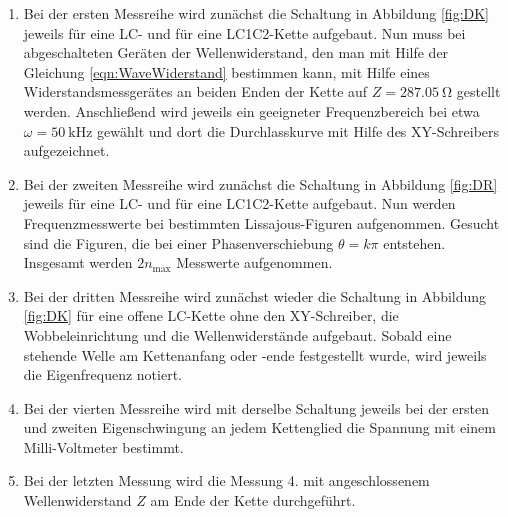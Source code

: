 \begin{enumerate}

\item
Bei der ersten Messreihe wird zunächst die Schaltung in Abbildung
\ref{fig:DK} jeweils für eine LC- und für eine LC1C2-Kette aufgebaut. Nun muss
bei abgeschalteten Geräten der Wellenwiderstand, den man mit Hilfe der
Gleichung \eqref{eqn:WaveWiderstand} bestimmen kann, mit Hilfe eines
Widerstandsmessgerätes
an beiden Enden der Kette auf $Z = \SI{287.05}{\ohm}$ gestellt werden.
Anschließend wird jeweils ein geeigneter Frequenzbereich bei etwa $\omega =
\SI{50}{\kilo\Hz}$ gewählt und dort die Durchlasskurve mit Hilfe des
XY-Schreibers aufgezeichnet.

\item
Bei der zweiten Messreihe wird zunächst die Schaltung in Abbildung
\ref{fig:DR} jeweils für eine LC- und für eine LC1C2-Kette aufgebaut.
Nun werden Frequenzmesswerte bei bestimmten Lissajous-Figuren aufgenommen.
Gesucht sind die Figuren, die bei einer Phasenverschiebung $\theta = k\pi$
entstehen. Insgesamt werden $2 n_\text{max}$ Messwerte aufgenommen.

\item
Bei der dritten Messreihe wird zunächst wieder die Schaltung in Abbildung
\ref{fig:DK} für eine offene LC-Kette ohne den XY-Schreiber, die
Wobbeleinrichtung und die Wellenwiderstände aufgebaut. Sobald eine
stehende Welle am Kettenanfang oder -ende festgestellt wurde, wird jeweils
die Eigenfrequenz notiert.

\item
Bei der vierten Messreihe wird mit derselbe Schaltung jeweils bei der ersten und
zweiten Eigenschwingung an jedem Kettenglied die Spannung mit einem
Milli-Voltmeter bestimmt.

\item
Bei der letzten Messung wird die Messung 4. mit angeschlossenem Wellenwiderstand
$Z$ am Ende der Kette durchgeführt.

\end{enumerate}
